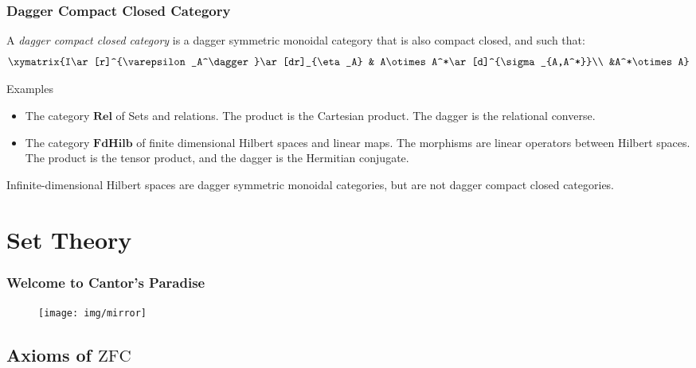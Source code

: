 \documentclass[UTF8,aspectratio=43,11pt,colorlinks,compress,openany]{beamer}%
\begin{document}
\begin{frame}\frametitle{Dagger Compact Closed Category}
\setlength\abovedisplayskip{0pt}
\setlength\belowdisplayskip{0pt}
\begin{definition}
	A \emph{dagger compact closed category} is a dagger symmetric monoidal category that is also compact closed, and such that:
	\[\xymatrix{I\ar[r]^{\varepsilon_A^\dagger}\ar[dr]_{\eta_A} & A\otimes A^*\ar[d]^{\sigma_{A,A^*}}\\ &A^*\otimes A}\]
\end{definition}\small
\begin{block}{Examples}
	\begin{itemize}
		\item The category $\mathbf{Rel}$ of Sets and relations. The product is the Cartesian product. The dagger is the relational converse.
		\item The category $\mathbf{FdHilb}$ of finite dimensional Hilbert spaces and linear maps. The morphisms are linear operators between Hilbert spaces. The product is the  tensor product, and the dagger is the Hermitian conjugate.
	\end{itemize}
\end{block}
Infinite-dimensional Hilbert spaces are dagger symmetric monoidal categories, but are not dagger compact closed categories.
\end{frame}


\section{Set Theory}


\begin{frame}\frametitle{Welcome to Cantor's Paradise}
\begin{figure}[H]
	\texttt{[image: img/mirror]}
\end{figure}
\end{frame}

\subsection{Axioms of $\mathrm{ZFC}$}
\end{document}
